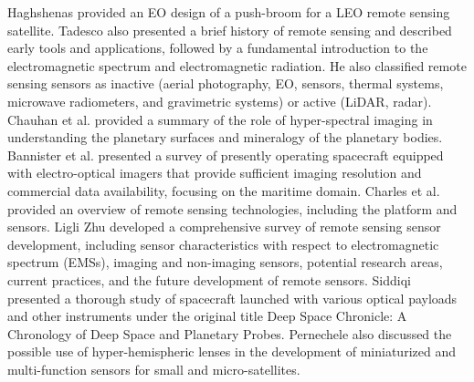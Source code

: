 \documentclass[final,5p,times,sort&compress,twocolumn]{elsarticle}
\begin{document}
Haghshenas \cite{haghshenas2014electro} provided an EO design of a push-broom for a LEO remote sensing satellite. Tadesco \cite{tedesco2015remote} also presented a brief history of remote sensing and described early tools and applications, followed by a fundamental introduction to the electromagnetic spectrum and electromagnetic radiation. He also classified remote sensing sensors as inactive (aerial photography, EO, sensors, thermal systems, microwave radiometers, and gravimetric systems) or active (LiDAR, radar). Chauhan et al. \cite{chauhan2015hyperspectral} provided a summary of the role of hyper-spectral imaging in understanding the planetary surfaces and mineralogy of the planetary bodies.  Bannister et al. \cite{bannister2015maritime} presented a survey of presently operating spacecraft equipped with electro-optical imagers that provide sufficient imaging resolution and commercial data availability, focusing on the maritime domain. Charles et al. \cite{toth2016remote} provided an overview of remote sensing technologies, including the platform and sensors.  Ligli Zhu \cite{zhu2018review} developed a comprehensive survey of remote sensing sensor development, including sensor characteristics with respect to electromagnetic spectrum (EMSs), imaging and non-imaging sensors, potential research areas, current practices, and the future development of remote sensors. Siddiqi \cite{siddiqi2018beyond} presented a thorough study of spacecraft launched with various optical payloads and other instruments under the original title Deep Space Chronicle: A Chronology of Deep Space and Planetary Probes. Pernechele \cite{pernechele2018hyper} also discussed the possible use of hyper-hemispheric lenses in the development of miniaturized and multi-function sensors for small and micro-satellites.\\
\end{document}
